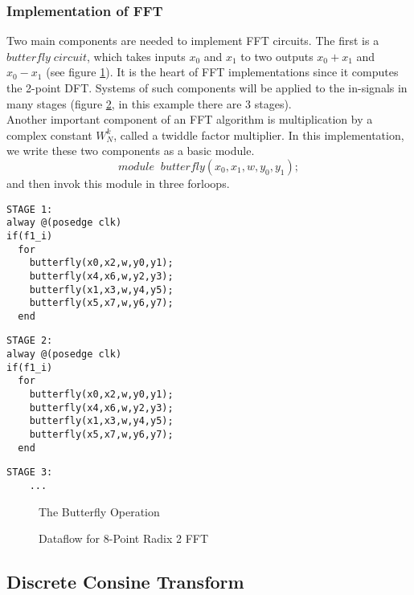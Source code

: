 \subsubsection{Implementation of FFT}
%
Two main components are needed to implement FFT circuits. The first is a $butterfly \; circuit$, which takes inputs $x_0$ and $x_1$ to two outputs $x_0 + x_1$ and $x_0 - x_1$ (see figure \ref{fig-butterfly}). It is the heart of FFT implementations since it computes the 2-point DFT. Systems of such components will be applied to the in-signals in many stages (figure \ref{fig-2radixfft}, in this example there are 3 stages).\\
Another important component of an FFT algorithm is multiplication by a complex constant $W_N^k$, called a twiddle factor multiplier. In this implementation, we write these two components as a basic module.
\[ module\;\; butterfly(x_0, x_1, w, y_0, y_1);\]
and then invok this module in three forloops.
\begin{verbatim}
STAGE 1:
alway @(posedge clk)    
if(f1_i)                
  for                     
    butterfly(x0,x2,w,y0,y1);            
    butterfly(x4,x6,w,y2,y3);           
    butterfly(x1,x3,w,y4,y5);            
    butterfly(x5,x7,w,y6,y7);            
  end                                   
\end{verbatim}
\begin{verbatim}
STAGE 2:
alway @(posedge clk)    
if(f1_i)                
  for                     
    butterfly(x0,x2,w,y0,y1);            
    butterfly(x4,x6,w,y2,y3);           
    butterfly(x1,x3,w,y4,y5);            
    butterfly(x5,x7,w,y6,y7);            
  end                                   
\end{verbatim}
\begin{verbatim}
STAGE 3:
    ...                          
\end{verbatim}
\begin{figure}[htbp]
\centering
{}
\caption{The Butterfly Operation}
\label{fig-butterfly}
\end{figure}
\begin{figure}[htbp]
\centering
{}
\caption{Dataflow for 8-Point Radix 2 FFT}
\label{fig-2radixfft}
\end{figure}
\subsection{Discrete Consine Transform}
